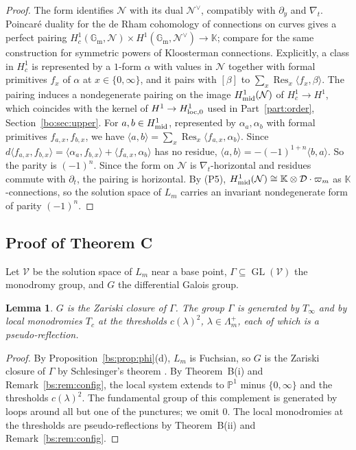\documentclass[11pt,a4paper]{article}
\newtheorem{lemma}[theorem]{Lemma}
\theoremstyle{definition}
\theoremstyle{remark}
\numberwithin{equation}{section}
\DeclareMathOperator{\Res}{Res}
\newcommand{\Gm}{\mathbb{G}_{\mathrm{m}}}
\newcommand{\Kt}{\mathbb{K}}
\newcommand{\cD}{\mathcal{D}}
\newcommand{\cN}{\mathcal{N}}
\newcommand{\PP}{\mathbb{P}}
\DeclareMathOperator{\GL}{GL}
\begin{document}
\begin{proof}
The form identifies $\cN$ with its dual $\cN^\vee$, compatibly with $\partial_y$ and $\nabla_t$. Poincaré duality for the de Rham cohomology of connections on curves gives a perfect pairing $H^1_c(\Gm,\cN)\times H^1(\Gm,\cN^\vee)\to\Kt$; compare \cite[\S2, Cor.~2.15]{FSY22} for the same construction for symmetric powers of Kloosterman connections. Explicitly, a class in $H^1_c$ is represented by a $1$-form $\alpha$ with values in $\cN$ together with formal primitives $f_x$ of $\alpha$ at $x\in\{0,\infty\}$, and it pairs with $[\beta]$ to $\sum_{x}\Res_x\langle f_x,\beta\rangle$. The pairing induces a nondegenerate pairing on the image $H^1_{\rm mid}(\cN)$ of $H^1_c\to H^1$, which coincides with the kernel of $H^1\to H^1_{\rm loc,0}$ used in Part~\ref{part:order}, Section~\ref{bo:sec:upper}. For $a,b\in H^1_{\rm mid}$, represented by $\alpha_a,\alpha_b$ with formal primitives $f_{a,x},f_{b,x}$, we have $\langle a,b\rangle=\sum_x\Res_x\langle f_{a,x},\alpha_b\rangle$. Since $d\langle f_{a,x},f_{b,x}\rangle=\langle\alpha_a,f_{b,x}\rangle+\langle f_{a,x},\alpha_b\rangle$ has no residue, $\langle a,b\rangle=-(-1)^{1+n}\langle b,a\rangle$. So the parity is $(-1)^n$. Since the form on $\cN$ is $\nabla_t$-horizontal and residues commute with $\partial_t$, the pairing is horizontal. By (P5), $H^1_{\rm mid}(\cN)\cong\Kt\otimes\cD\cdot\varpi_m$ as $\Kt$-connections, so the solution space of $L_m$ carries an invariant nondegenerate form of parity $(-1)^n$.
\end{proof}

\subsection{Proof of Theorem C}
Let $\mathcal V$ be the solution space of $L_m$ near a base point, $\Gamma\subseteq\GL(\mathcal V)$ the monodromy group, and $G$ the differential Galois group.

\begin{lemma}\label{bs:lem:regular}
$G$ is the Zariski closure of $\Gamma$. The group $\Gamma$ is generated by $T_\infty$ and by local monodromies $T_c$ at the thresholds $c(\lambda)^2$, $\lambda\in\Lambda_m^+$, each of which is a pseudo-reflection.
\end{lemma}

\begin{proof}
By Proposition~\ref{bs:prop:phi}(d), $L_m$ is Fuchsian, so $G$ is the Zariski closure of $\Gamma$ by Schlesinger's theorem \cite{vdPS03}. By Theorem~B(i) and Remark~\ref{bs:rem:config}, the local system extends to $\PP^1$ minus $\{0,\infty\}$ and the thresholds $c(\lambda)^2$. The fundamental group of this complement is generated by loops around all but one of the punctures; we omit $0$. The local monodromies at the thresholds are pseudo-reflections by Theorem~B(ii) and Remark~\ref{bs:rem:config}.
\end{proof}
\end{document}
